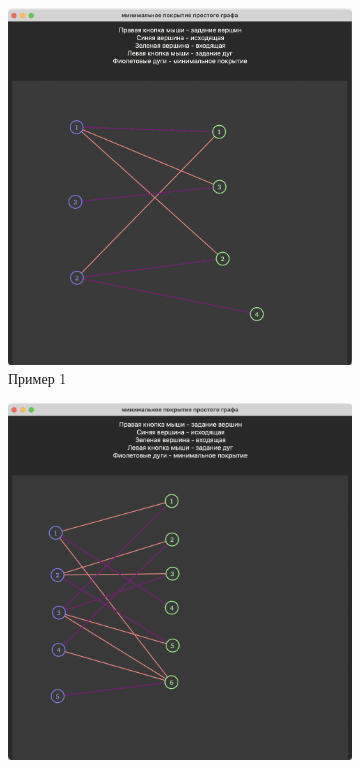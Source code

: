 \documentclass[12pt]{article}
\begin{document}
\begin{figure}[h]
    \begin{subfigure}{0.3\textwidth}
        \includegraphics[width=1\textwidth]{screenshot2.png}
        \caption{Пример 1}
        \label{fig:subim1}
    \end{subfigure}
    \begin{subfigure}{0.3\textwidth}
        \includegraphics[width=1\textwidth]{screenshot3.png}

\end{subfigure}
\end{figure}
\end{document}
